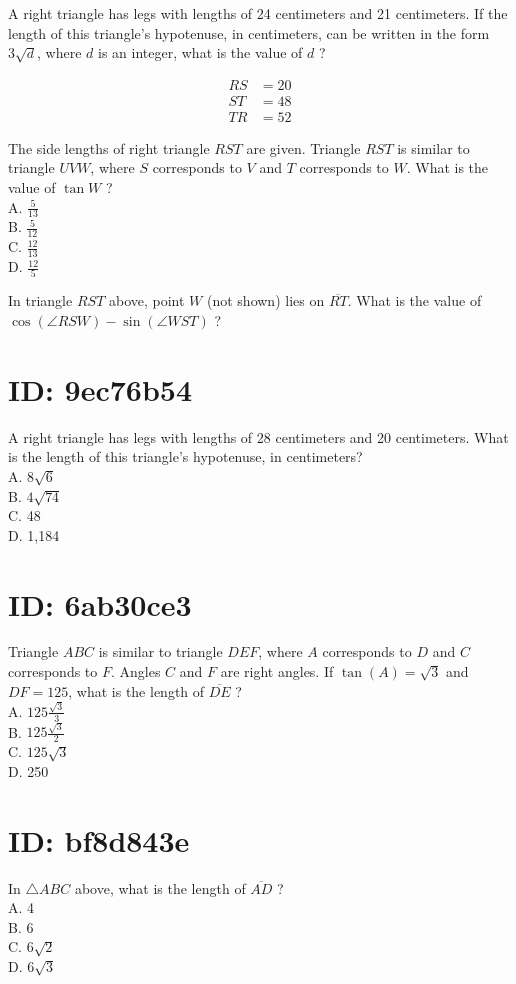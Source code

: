 A right triangle has legs with lengths of 24 centimeters and 21 centimeters. If the length of this triangle's hypotenuse, in centimeters, can be written in the form $3 \sqrt{d}$, where $d$ is an integer, what is the value of $d$ ?

$$
\begin{aligned}
R S & =20 \\
S T & =48 \\
T R & =52
\end{aligned}
$$

The side lengths of right triangle $R S T$ are given. Triangle $R S T$ is similar to triangle $U V W$, where $S$ corresponds to $V$ and $T$ corresponds to $W$. What is the value of $\tan W$ ?\\
A. $\frac{5}{13}$\\
B. $\frac{5}{12}$\\
C. $\frac{12}{13}$\\
D. $\frac{12}{5}$

In triangle $R S T$ above, point $W$ (not shown) lies on $\overline{R T}$. What is the value of $\cos (\angle R S W)-\sin (\angle W S T)$ ?

\section*{ID: 9ec76b54}
A right triangle has legs with lengths of 28 centimeters and 20 centimeters. What is the length of this triangle's hypotenuse, in centimeters?\\
A. $8 \sqrt{6}$\\
B. $4 \sqrt{74}$\\
C. 48\\
D. 1,184

\section*{ID: 6ab30ce3}
Triangle $A B C$ is similar to triangle $D E F$, where $A$ corresponds to $D$ and $C$ corresponds to $F$. Angles $C$ and $F$ are right angles. If $\tan (A)=\sqrt{3}$ and $D F=125$, what is the length of $\overline{D E}$ ?\\
A. $125 \frac{\sqrt{3}}{3}$\\
B. $125 \frac{\sqrt{3}}{2}$\\
C. $125 \sqrt{3}$\\
D. 250

\section*{ID: bf8d843e}
In $\triangle A B C$ above, what is the length of $\overline{A D}$ ?\\
A. 4\\
B. 6\\
C. $6 \sqrt{2}$\\
D. $6 \sqrt{3}$

